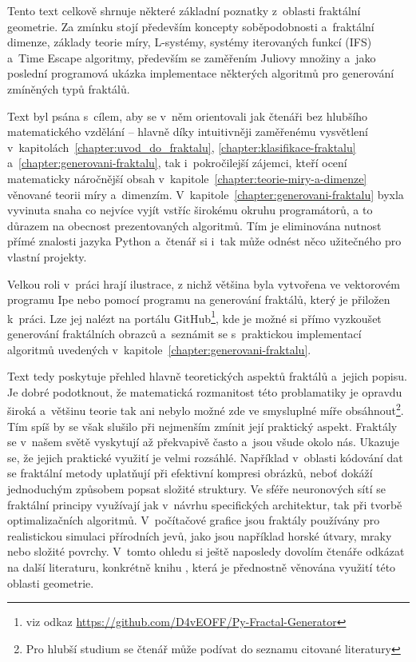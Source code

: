 
Tento text celkově shrnuje některé základní poznatky z~oblasti fraktální geometrie. Za zmínku stojí především koncepty soběpodobnosti a~fraktální dimenze, základy teorie míry, L-systémy, systémy iterovaných funkcí (IFS) a~Time Escape algoritmy, především se zaměřením Juliovy množiny a~jako poslední programová ukázka implementace některých algoritmů pro generování zmíněných typů fraktálů.

Text byl psána s~cílem, aby se v~něm orientovali jak čtenáři bez hlubšího matematického vzdělání -- hlavně díky intuitivněji zaměřenému vysvětlení v~kapitolách~\ref{chapter:uvod_do_fraktalu}, \ref{chapter:klasifikace-fraktalu} a~\ref{chapter:generovani-fraktalu}, tak i~pokročilejší zájemci, kteří ocení matematicky náročnější obsah v~kapitole~\ref{chapter:teorie-miry-a-dimenze} věnované teorii míry a~dimenzím. V~kapitole~\ref{chapter:generovani-fraktalu} byxla vyvinuta snaha co nejvíce vyjít vstříc širokému okruhu programátorů, a to důrazem na obecnost prezentovaných algoritmů. Tím je eliminována nutnost přímé znalosti jazyka Python a~čtenář si i~tak může odnést něco užitečného pro vlastní projekty.

Velkou roli v~práci hrají ilustrace, z nichž většina byla vytvořena ve vektorovém programu Ipe nebo pomocí programu na generování fraktálů, který je přiložen k~práci. Lze jej nalézt na portálu GitHub\footnote{viz odkaz \url{https://github.com/D4vEOFF/Py-Fractal-Generator}}, kde je možné si přímo vyzkoušet generování fraktálních obrazců a~seznámit se s~praktickou implementací algoritmů uvedených v~kapitole~\ref{chapter:generovani-fraktalu}.

Text tedy poskytuje přehled hlavně teoretických aspektů fraktálů a~jejich popisu. Je dobré podotknout, že matematická rozmanitost této problamatiky je opravdu široká a~většinu teorie tak ani nebylo možné zde ve smysluplné míře obsáhnout\footnote{Pro hlubší studium se čtenář může podívat do seznamu citované literatury}. Tím spíš by se však slušilo při nejmenším zmínit její praktický aspekt. Fraktály se v~našem světě vyskytují až překvapivě často a~jsou všude okolo nás. Ukazuje se, že jejich praktické využití je velmi rozsáhlé. Například v~oblasti kódování dat se fraktální metody uplatňují při efektivní kompresi obrázků, neboť dokáží jednoduchým způsobem popsat složité struktury. Ve sféře neuronových sítí se fraktální principy využívají jak v~návrhu specifických architektur, tak při tvorbě optimalizačních algoritmů. V~počítačové grafice jsou fraktály používány pro realistickou simulaci přírodních jevů, jako jsou například horské útvary, mraky nebo složité povrchy. V~tomto ohledu si ještě naposledy dovolím čtenáře odkázat na další literaturu, konkrétně knihu \cite{Zelinka2006}, která je přednostně věnována využití této oblasti geometrie.

